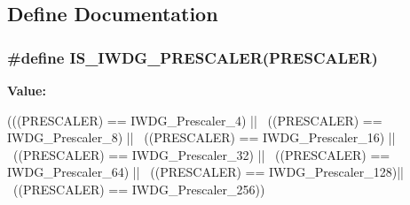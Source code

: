 \subsection{Define Documentation}
\hypertarget{group__IWDG__prescaler_gab1e0695c1a22840d5be7c7fad283f4ba}{
\subsubsection[{IS\_\-IWDG\_\-PRESCALER}]{\setlength{\rightskip}{0pt plus 5cm}\#define IS\_\-IWDG\_\-PRESCALER(PRESCALER)}}
\label{group__IWDG__prescaler_gab1e0695c1a22840d5be7c7fad283f4ba}
{\bfseries Value:}
\begin{DoxyCode}
(((PRESCALER) == IWDG_Prescaler_4)  || \
                                      ((PRESCALER) == IWDG_Prescaler_8)  || \
                                      ((PRESCALER) == IWDG_Prescaler_16) || \
                                      ((PRESCALER) == IWDG_Prescaler_32) || \
                                      ((PRESCALER) == IWDG_Prescaler_64) || \
                                      ((PRESCALER) == IWDG_Prescaler_128)|| \
                                      ((PRESCALER) == IWDG_Prescaler_256))
\end{DoxyCode}
